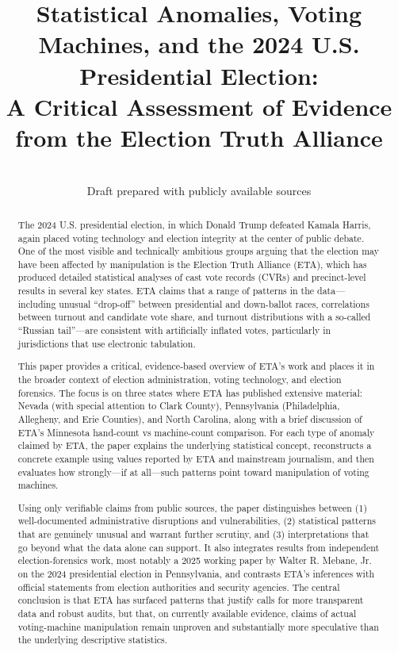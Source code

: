 \documentclass[12pt]{article}
\title{Statistical Anomalies, Voting Machines, and the 2024 U.S. Presidential Election:\\
A Critical Assessment of Evidence from the Election Truth Alliance}
\author{}
\date{\\Draft prepared with publicly available sources}
\begin{document}
\maketitle

\begin{abstract}
The 2024 U.S. presidential election, in which Donald Trump defeated Kamala Harris, again placed voting technology and election integrity at the center of public debate. One of the most visible and technically ambitious groups arguing that the election may have been affected by manipulation is the Election Truth Alliance (ETA), which has produced detailed statistical analyses of cast vote records (CVRs) and precinct-level results in several key states. ETA claims that a range of patterns in the data---including unusual ``drop-off'' between presidential and down-ballot races, correlations between turnout and candidate vote share, and turnout distributions with a so-called ``Russian tail''---are consistent with artificially inflated votes, particularly in jurisdictions that use electronic tabulation.

This paper provides a critical, evidence-based overview of ETA's work and places it in the broader context of election administration, voting technology, and election forensics. The focus is on three states where ETA has published extensive material: Nevada (with special attention to Clark County), Pennsylvania (Philadelphia, Allegheny, and Erie Counties), and North Carolina, along with a brief discussion of ETA's Minnesota hand-count vs machine-count comparison. For each type of anomaly claimed by ETA, the paper explains the underlying statistical concept, reconstructs a concrete example using values reported by ETA and mainstream journalism, and then evaluates how strongly---if at all---such patterns point toward manipulation of voting machines.

Using only verifiable claims from public sources, the paper distinguishes between (1) well-documented administrative disruptions and vulnerabilities, (2) statistical patterns that are genuinely unusual and warrant further scrutiny, and (3) interpretations that go beyond what the data alone can support. It also integrates results from independent election-forensics work, most notably a 2025 working paper by Walter R. Mebane, Jr. on the 2024 presidential election in Pennsylvania, and contrasts ETA's inferences with official statements from election authorities and security agencies. The central conclusion is that ETA has surfaced patterns that justify calls for more transparent data and robust audits, but that, on currently available evidence, claims of actual voting-machine manipulation remain unproven and substantially more speculative than the underlying descriptive statistics.
\end{abstract}
\end{document}
